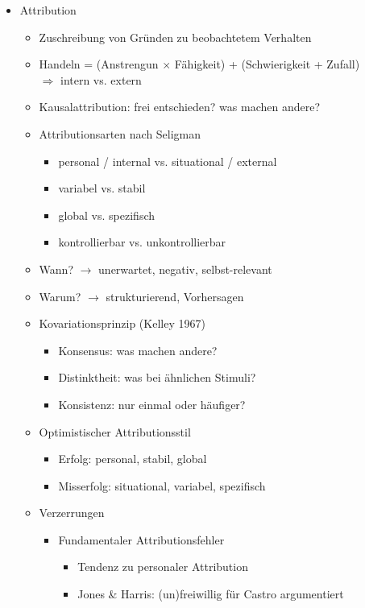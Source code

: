 \documentclass[11pt, paper=a4, twocolumn]{scrartcl}
\begin{document}
\begin{itemize}
			\item Attribution
				\begin{itemize}
					\item Zuschreibung von Gründen zu beobachtetem Verhalten
					\item Handeln = (Anstrengun $\times$ Fähigkeit) + (Schwierigkeit + Zufall)\\
						$\Rightarrow$ intern vs. extern
					\item Kausalattribution: frei entschieden? was machen andere?
					\item Attributionsarten nach Seligman
						\begin{itemize}
							\item personal / internal vs. situational / external
							\item variabel vs. stabil
							\item global vs. spezifisch
							\item kontrollierbar vs. unkontrollierbar
						\end{itemize}
					\item Wann? $\rightarrow$ unerwartet, negativ, selbst-relevant
					\item Warum? $\rightarrow$ strukturierend, Vorhersagen
					\item Kovariationsprinzip (Kelley 1967)
						\begin{itemize}
							\item Konsensus: was machen andere?
							\item Distinktheit: was bei ähnlichen Stimuli?
							\item Konsistenz: nur einmal oder häufiger?
						\end{itemize}
					\item Optimistischer Attributionsstil
						\begin{itemize}
							\item Erfolg: personal, stabil, global
							\item Misserfolg: situational, variabel, spezifisch
						\end{itemize}
					\item Verzerrungen
						\begin{itemize}
							\item Fundamentaler Attributionsfehler
								\begin{itemize}
									\item Tendenz zu personaler Attribution
									\item Jones \& Harris: (un)freiwillig für Castro argumentiert

\end{itemize}
\end{itemize}
\end{itemize}
\end{itemize}
\end{document}
